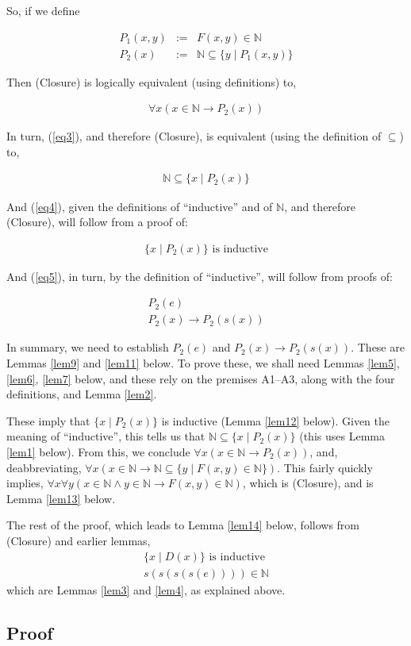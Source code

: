 \documentclass[11pt,a4paper]{article}
\newcommand{\N}{ \ensuremath{ \mathbb{N}}}
\newcommand{\beq}{\begin{eqnarray}}
\newcommand{\eeq}{\end{eqnarray}}
\theoremstyle{definition}
\begin{document}
So, if we define

\beq
P_1(x,y) &:=& F(x,y) \in \N \\
P_2(x)  &:=& \N \subseteq \{ y \mid P_1(x,y) \}
\eeq

Then (Closure) is logically equivalent (using definitions) to,

\beq
\forall x  (x \in \N \to P_2(x))  \label{eq3}
\eeq

In turn,  (\ref{eq3}), and therefore (Closure), is equivalent (using the definition of $\subseteq$) to,

\beq
\N \subseteq \{x \mid P_2(x)\} \label{eq4}
\eeq

And (\ref{eq4}), given the definitions of ``inductive'' and of $\N$, and therefore (Closure), will follow from a proof of:

\beq
\{x \mid P_2(x)\} \text{ is inductive} \label{eq5}
\eeq

And (\ref{eq5}), in turn, by the definition of ``inductive'', will follow from proofs of:

\beq
P_2(e) \\
P_2(x) \to P_2(s(x))
\eeq

In summary, we need to establish $P_2(e)$ and $P_2(x) \to P_2(s(x))$. These are Lemmas \ref{lem9} and \ref{lem11} below. To prove these, we shall need Lemmas \ref{lem5}, \ref{lem6}, \ref{lem7} below, and these rely on the premises A1--A3, along with the four definitions, and Lemma \ref{lem2}.

These imply that $\{x \mid P_2(x)\}$ is inductive (Lemma \ref{lem12} below). Given the meaning of ``inductive'', this tells us that $\N \subseteq \{x \mid P_2(x)\}$ (this uses Lemma \ref{lem1} below). From this, we conclude $\forall x  (x \in \N \to P_2(x))$, and, deabbreviating, $\forall x  (x \in \N \to \N \subseteq \{ y \mid F(x,y) \in \N \})$. This fairly quickly implies, $\forall x \forall y (x \in \N \wedge y \in \N \to F(x,y) \in \N)$, which is (Closure), and is Lemma \ref{lem13} below.

The rest of the proof, which leads to Lemma \ref{lem14} below, follows from (Closure) and earlier lemmas,
\beq
\{x \mid D(x)\} \text{ is inductive}\\
s(s(s(s(e)))) \in \N
\eeq
which are Lemmas \ref{lem3} and \ref{lem4}, as explained above.

\subsection{Proof}
\end{document}
